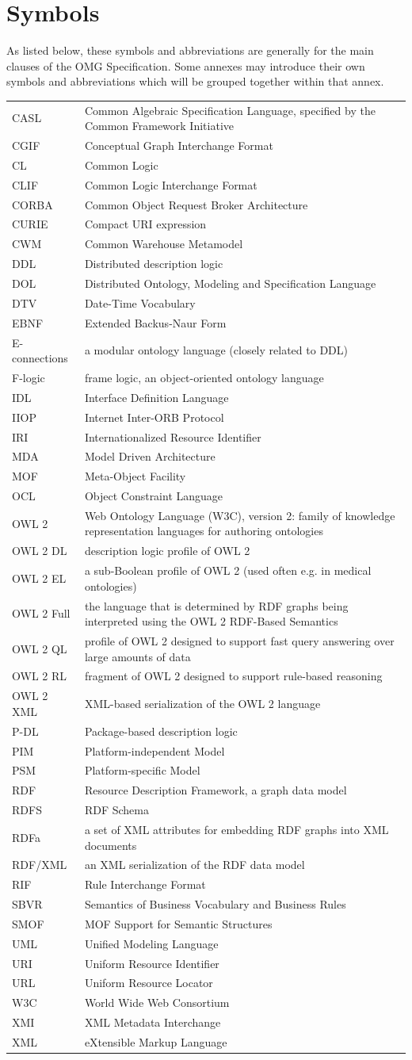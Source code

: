 \documentclass[10pt,fleqn,%
\ifpretendfinal
final%
\else
draft%
\fi,
]{scrreprt}
\makeatletter
\newcommand*{\eg}{e.g.\@\xspace}
\newcommand*{\IS}{OMG Specification\xspace}
\newenvironment{symbols}[0]{\begin{longtable}{p{.15\textwidth}p{.84\textwidth}}}{\end{longtable}}
\newcommand{\symboldef}[2]{ #1 & #2 \\}
\makeatother
\begin{document}
\chapter{Symbols}

As listed below, these symbols and abbreviations are generally for the main clauses of the \IS. Some annexes may introduce their own symbols and abbreviations which will be grouped together within that annex.

\begin{symbols}
\symboldef{CASL}{Common Algebraic Specification Language, specified by the Common Framework Initiative}
\symboldef{CGIF}{Conceptual Graph Interchange Format}
\symboldef{CL}{Common Logic }
\symboldef{CLIF}{Common Logic Interchange Format}
\symboldef{CORBA}{Common Object Request Broker Architecture}
\symboldef{CURIE}{Compact URI expression}
\symboldef{CWM}{Common Warehouse Metamodel}
\symboldef{DDL}{Distributed description logic}
\symboldef{DOL}{Distributed Ontology, Modeling and Specification Language}
\symboldef{DTV}{Date-Time Vocabulary}
\symboldef{EBNF}{Extended Backus-Naur Form}
\symboldef{E-connections}{a modular ontology language (closely related to DDL)}
\symboldef{F-logic}{frame logic, an object-oriented ontology language}
\symboldef{IDL}{Interface Definition Language}
\symboldef{IIOP}{Internet Inter-ORB Protocol}
\symboldef{IRI}{Internationalized Resource Identifier}
\symboldef{MDA}{Model Driven Architecture}
\symboldef{MOF}{Meta-Object Facility}
\symboldef{OCL}{Object Constraint Language}
\symboldef{OWL 2}{Web Ontology Language (W3C), version 2: family of knowledge representation languages for authoring ontologies}
\symboldef{OWL 2 DL}{description logic profile of OWL 2}
\symboldef{OWL 2 EL}{a sub-Boolean profile of OWL 2 (used often \eg in medical ontologies)}
\symboldef{OWL 2 Full}{the language that is determined by RDF graphs being interpreted 
using the OWL 2 RDF-Based Semantics \cite{W3C:REC-owl2-rdf-based-semantics-20091027}}
\symboldef{OWL 2 QL}{profile of OWL 2 designed to support fast query answering over large amounts of data}
\symboldef{OWL 2 RL}{fragment of OWL 2 designed to support rule-based reasoning}
\symboldef{OWL 2 XML}{XML-based serialization of the OWL 2 language}
\symboldef{P-DL}{Package-based description logic}
\symboldef{PIM}{Platform-independent Model}
\symboldef{PSM}{Platform-specific Model}
\symboldef{RDF}{Resource Description Framework, a graph data model}
\symboldef{RDFS}{RDF Schema}
\symboldef{RDFa}{a set of XML attributes for embedding RDF graphs into XML documents}
\symboldef{RDF/XML}{an XML serialization of the RDF data model}
\symboldef{RIF}{Rule Interchange Format}
\symboldef{SBVR}{Semantics of Business Vocabulary and Business Rules}
\symboldef{SMOF}{MOF Support for Semantic Structures}
\symboldef{UML}{Unified Modeling Language}
\symboldef{URI}{Uniform Resource Identifier}
\symboldef{URL}{Uniform Resource Locator}
\symboldef{W3C}{World Wide Web Consortium}
\symboldef{XMI}{XML Metadata Interchange}
\symboldef{XML}{eXtensible Markup Language}
\end{symbols}
\end{document}
